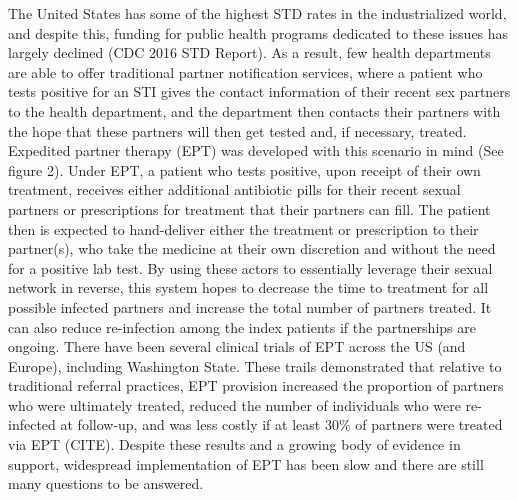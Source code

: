 \documentclass [11pt, proquest] {uwthesis}[2015/03/03]
\begin{document}
The United States has some of the highest STD rates in the
industrialized world, and despite this, funding for public health
programs dedicated to these issues has largely declined (CDC 2016 STD
Report). As a result, few health departments are able to offer
traditional partner notification services, where a patient who tests
positive for an STI gives the contact information of their recent sex
partners to the health department, and the department then contacts
their partners with the hope that these partners will then get tested
and, if necessary, treated. Expedited partner therapy (EPT) was
developed with this scenario in mind (See figure 2). Under EPT, a
patient who tests positive, upon receipt of their own treatment,
receives either additional antibiotic pills for their recent sexual
partners or prescriptions for treatment that their partners can fill.
The patient then is expected to hand-deliver either the treatment or
prescription to their partner(s), who take the medicine at their own
discretion and without the need for a positive lab test. By using these
actors to essentially leverage their sexual network in reverse, this
system hopes to decrease the time to treatment for all possible infected
partners and increase the total number of partners treated. It can also
reduce re-infection among the index patients if the partnerships are
ongoing. There have been several clinical trials of EPT across the US
(and Europe), including Washington State. These trails demonstrated that
relative to traditional referral practices, EPT provision increased the
proportion of partners who were ultimately treated, reduced the number
of individuals who were re-infected at follow-up, and was less costly if
at least 30\% of partners were treated via EPT (CITE). Despite these
results and a growing body of evidence in support, widespread
implementation of EPT has been slow and there are still many questions
to be answered.
\end{document}
